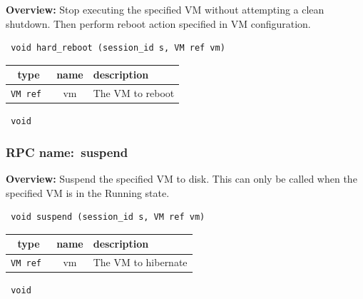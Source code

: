 {\bf Overview:} 
Stop executing the specified VM without attempting a clean shutdown. Then
perform reboot action specified in VM configuration.

\begin{verbatim} void hard_reboot (session_id s, VM ref vm)\end{verbatim}



 
\vspace{0.3cm}
\begin{tabular}{|c|c|p{7cm}|}
 \hline
{\bf type} & {\bf name} & {\bf description} \\ \hline
{\tt VM ref } & vm & The VM to reboot \\ \hline 

\end{tabular}

\vspace{0.3cm}

{\tt 
void
}



\vspace{0.3cm}
\vspace{0.3cm}
\vspace{0.3cm}
\subsubsection{RPC name:~suspend}

{\bf Overview:} 
Suspend the specified VM to disk.  This can only be called when the
specified VM is in the Running state.

\begin{verbatim} void suspend (session_id s, VM ref vm)\end{verbatim}



 
\vspace{0.3cm}
\begin{tabular}{|c|c|p{7cm}|}
 \hline
{\bf type} & {\bf name} & {\bf description} \\ \hline
{\tt VM ref } & vm & The VM to hibernate \\ \hline 

\end{tabular}

\vspace{0.3cm}

{\tt 
void
}



